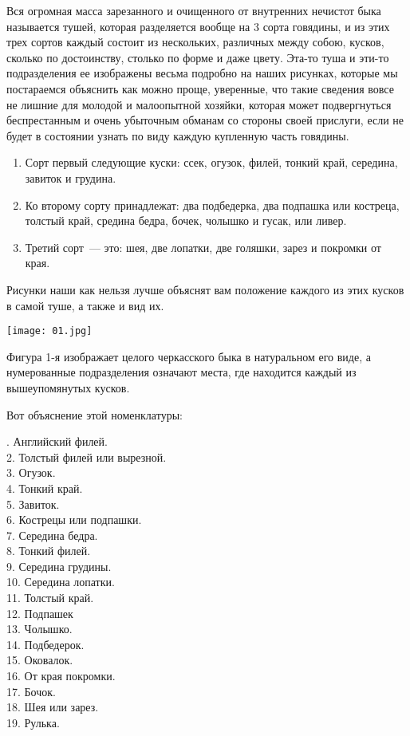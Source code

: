 Вся огромная масса зарезанного и очищенного от внутренних нечистот быка называется тушей, которая разделяется вообще на 3 сорта говядины, и из этих трех сортов каждый состоит из нескольких, различных между собою, кусков, сколько по достоинству, столько по форме и даже цвету. Эта-то туша и эти-то подразделения ее изображены весьма подробно на наших рисунках, которые мы постараемся объяснить как можно проще, уверенные, что такие сведения вовсе не лишние для молодой и малоопытной хозяйки, которая может подвергнуться беспрестанным и очень убыточным обманам со стороны своей прислуги, если не будет в состоянии узнать по виду каждую купленную часть говядины.

\begin{enumerate}
	\item Сорт первый следующие куски: ссек, огузок, филей, тонкий край, середина, завиток и грудина.
	\item Ко второму сорту принадлежат: два подбедерка, два подпашка или костреца, толстый край, средина бедра, бочек, чолышко и гусак, или ливер.
	\item Третий сорт~--- это: шея, две лопатки, две голяшки, зарез и покромки от края.
\end{enumerate}

Рисунки наши как нельзя лучше объяснят вам положение каждого из этих кусков в самой туше, а также и вид их.

\texttt{[image: 01.jpg]}

Фигура 1-я изображает целого черкасского быка в натуральном его виде, а нумерованные подразделения означают места, где находится каждый из вышеупомянутых кусков.

Вот объяснение этой номенклатуры:

. Английский филей. \\ 2. Толстый филей или вырезной. \\ 3. Огузок. \\ 4. Тонкий край. \\ 5. Завиток. \\ 6. Кострецы или подпашки. \\ 7. Середина бедра. \\ 8. Тонкий филей. \\ 9. Середина грудины. \\ 10. Середина лопатки. \\ 11. Толстый край. \\ 12. Подпашек \\ 13. Чолышко. \\ 14. Подбедерок. \\ 15. Оковалок. \\ 16. От края покромки. \\ 17. Бочок. \\ 18. Шея или зарез. \\ 19. Рулька.

